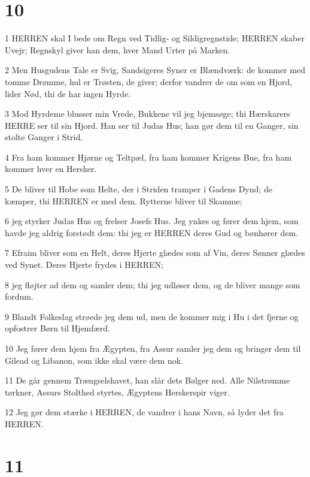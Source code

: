 \chapter{10}

\par 1 HERREN skal I bede om Regn ved Tidlig- og Sildigregnstide; HERREN skaber Uvejr; Regnskyl giver han dem, hver Mand Urter på Marken.
\par 2 Men Husgudens Tale er Svig, Sandsigeres Syner er Blændværk: de kommer med tomme Drømme, hul er Trøsten, de giver; derfor vandrer de om som en Hjord, lider Nød, thi de har ingen Hyrde.
\par 3 Mod Hyrdeme blusser min Vrede, Bukkene vil jeg bjemsøge; thi Hærskarers HERRE ser til sin Hjord. Han ser til Judas Hus; han gør dem til en Ganger, sin stolte Ganger i Strid.
\par 4 Fra ham kommer Hjørne og Teltpæl, fra ham kommer Krigens Bue, fra ham kommer hver en Hersker.
\par 5 De bliver til Hobe som Helte, der i Striden tramper i Gadens Dynd; de kæmper, thi HERREN er med dem. Rytterne bliver til Skamme;
\par 6 jeg styrker Judas Hus og frelser Josefs Hus. Jeg ynkes og fører dem hjem, som havde jeg aldrig forstødt dem: thi jeg er HERREN deres Gud og bønhører dem.
\par 7 Efraim bliver som en Helt, deres Hjerte glædes som af Vin, deres Sønner glædes ved Synet. Deres Hjerte frydes i HERREN;
\par 8 jeg fløjter ad dem og samler dem; thi jeg udløser dem, og de bliver mange som fordum.
\par 9 Blandt Folkeslag strøede jeg dem ud, men de kommer mig i Hu i det fjerne og opfostrer Børn til Hjemfærd.
\par 10 Jeg fører dem hjem fra Ægypten, fra Assur samler jeg dem og bringer dem til Gilead og Libanon, som ikke skal være dem nok.
\par 11 De går gennem Trængselshavet, han slår dets Bølger ned. Alle Nilstrømme tørkner, Assurs Stolthed styrtes, Ægyptens Herskerspir viger.
\par 12 Jeg gør dem stærke i HERREN, de vandrer i hans Navn, så lyder det fra HERREN.

\chapter{11}

